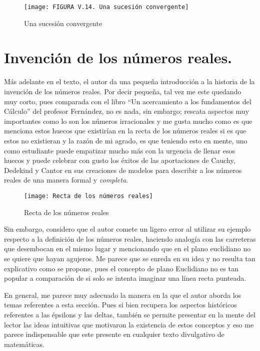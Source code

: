 \documentclass[a4paper,10pt]{article}
\begin{document}
\begin{figure}[h]
    \centering
    \texttt{[image: FIGURA V.14. Una sucesión convergente]}
    \caption{Una sucesión convergente}
    \label{fig:sucesion_convergente}
\end{figure}

\section*{Invención de los números reales.}

Más adelante en el texto, el autor da una pequeña introducción a la historia de la invención de los números reales. Por decir pequeña, tal vez me este quedando muy corto, pues comparada con el libro \enquote{Un acercamiento a los fundamentos del Cálculo} del profesor Fernández, no es nada, sin embargo; rescata aspectos muy importantes como lo son los números irracionales y me gusta mucho como es que menciona estos huecos que existirían en la recta de los números reales si es que estos no existieran y la razón de mi agrado, es que teniendo esto en mente, uno como estudiante puede empatizar mucho más con la urgencia de llenar esos huecos y puede celebrar con gusto los éxitos de las aportaciones de Cauchy, Dedekind y Cantor en sus creaciones de modelos para describir a los números reales de una manera formal y \textit{completa}.

\begin{figure}[h]
    \centering
    \texttt{[image: Recta de los números reales]}
    \caption{Recta de los números reales}
    \label{fig:recta_reales}
\end{figure}

Sin embargo, considero que el autor comete un ligero error al utilizar su ejemplo respecto a la definición de los números reales, haciendo analogía con las carreteras que desembocan en el mismo lugar y mencionando que en el plano euclidiano no se quiere que hayan agujeros. Me parece que se enreda en su idea y no resulta tan explicativo como se propone, pues el concepto de plano Euclidiano no es tan popular a comparación de si solo se intenta imaginar una línea recta punteada. 

En general, me parece muy adecuado la manera en la que el autor aborda los temas referentes a esta sección. Pues si bien recupera los aspectos históricos referentes a las épsilons y las deltas, también se permite presentar en la mente del lector las ideas intuitivas que motivaron la existencia de estos conceptos y eso me parece indispensable que este presente en cualquier texto divulgativo de matemáticas. 
\end{document}
